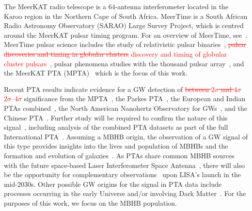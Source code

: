 \documentclass[fleqn,usenatbib]{mnras}
\newcommand{\change}{\textcolor{red}}
\begin{document}
The MeerKAT radio telescope is a $64$-antenna interferometer located in the Karoo region in the Northern Cape of South Africa.
MeerTime is a South African Radio Astronomy Observatory (SARAO) Large Survey Project, which is centred around the MeerKAT pulsar timing program. 
For an overview of MeerTime, see~\cite{MeerTimeBailesEtAl:2016, MeerTimeBailesEtAl:2020}. 
MeerTime pulsar science includes the study of relativistic pulsar binaries~\citep{MeerTimeRelBin:2021}, \change{\st{pulsar discoveries and timing in globular clusters} discovery and timing of globular cluster pulsars}~\citep{MeerTimeGlobularClusterPSRs:2021}, pulsar phenomena studies with the thousand pulsar array~\citep{MeerTime1000PSR:2020,MeerTime1000PSR:2021}, and the MeerKAT PTA (MPTA)~\citep{MPTANoiseMilesEtAl:2025, MPTAGWMilesEtAl:2025, MPTAMapsGrunthalEtAl:2025, MilesEtAl:2023,SpiewakEtAl:2022} which is the focus of this work. 

Recent PTA results indicate evidence for a GW detection of \change{\st{between $2\sigma$ and $4\sigma$} $2\sigma$--$4\sigma$} significance from the MPTA~\citep{MPTAGWMilesEtAl:2025}, the Parkes PTA~\citep[PPTA;][]{PPTAGWReardonEtAl:2023}, the European and Indian PTAs combined~\citep[EPTA+InPTA;][]{ETPAInPTAGWBAntoniadisEtAl:2023}, the North American Nanohertz Observatory for GWs~\citep[NANOGrav;][]{NANOGravGWBAgazieEtAl:2023}, and the Chinese PTA~\citep[CPTA;][]{CPTAGWBXuEtAl:2023}.
Further study will be required to confirm the nature of this signal~\citep[see, for example,][]{ZicEtAl:2022}, including analysis of the combined PTA datasets as part of the full International PTA~\citep[IPTA;][]{IPTADR2:2022, IPTA:2016, ChenWuHuangIPTADR2:2021, AgaziEtlAl:2024}. 
Assuming a MBHB origin, the observation of a GW signal of this type provides insights into the lives and population of MBHBs and the formation and evolution of galaxies~\cite[e.g.][]{EPTAInPTAInterp:2023, NANOGravMBHBInterp:2023, SteinleEtAl:2023, BarausseEtAl:2023, MiddEtAl:2021, ChenSesanaConselice:2019}. 
As PTAs share common MBHB sources with the future space-based Laser Interferometer Space Antenna~\citep[LISA;][]{LISA:2024}, there will also be the opportunity for complementary observations~\citep{SteinleEtAl:2023} upon LISA's launch in the mid-2030s.
Other possible GW origins for the signal in PTA data include processes occurring in the early Universe and/or involving Dark Matter~\citep{EPTAInPTAInterp:2023, NANOGravNewPhysics:2023}.
For the purposes of this work, we focus on the MBHB population. 
\end{document}
